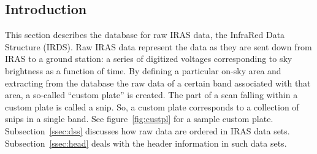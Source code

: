 \subsection{Introduction}

This section describes the database for raw IRAS data, the InfraRed Data
Structure (IRDS).  Raw IRAS data represent the data as they are sent
down from IRAS to a ground station: a series of digitized voltages
corresponding to sky brightness as a function of time.  By defining a
particular on-sky area and extracting from the database the raw data of
a certain band associated with that area, a so-called ``custom plate''
is created.  The part of a scan falling within a custom plate is called
a snip.  So, a custom plate corresponds to a collection of snips in a
single band.  See figure~\ref{fig:custpl} for a sample custom plate. 
Subsection~\ref{ssec:dss} discusses how raw data are ordered in IRAS
data sets.  Subsection~\ref{ssec:head} deals with the header information
in such data sets. 

\clearpage

